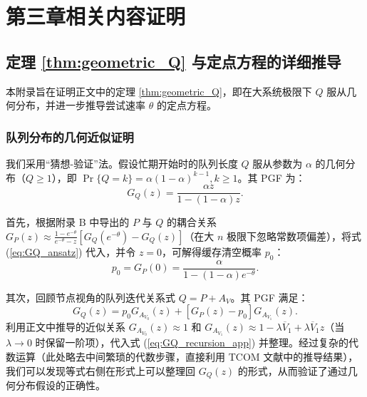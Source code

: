 \chapter{第三章相关内容证明}
\label{app:sast_appendix}





\section{定理 \ref{thm:geometric_Q} 与定点方程的详细推导}
\label{app:proof_theorem_fixed_point}


本附录旨在证明正文中的定理 \ref{thm:geometric_Q}，即在大系统极限下 $Q$ 服从几何分布，并进一步推导尝试速率 $\theta$ 的定点方程。

\subsection{队列分布的几何近似证明}

我们采用“猜想-验证”法。假设忙期开始时的队列长度 $Q$ 服从参数为 $\alpha$ 的几何分布（$Q \ge 1$），即 $\Pr\{Q=k\} = \alpha(1-\alpha)^{k-1}, k \ge 1$。其 PGF 为：
\begin{equation}
	\label{eq:GQ_ansatz}
	G_Q(z) = \frac{\alpha z}{1 - (1 - \alpha) z}.
\end{equation}

首先，根据附录 B 中导出的 $P$ 与 $Q$ 的耦合关系 $G_P(z) \approx \frac{1 - e^{-\theta}}{e^{-\theta} - z} [G_Q(e^{-\theta}) - G_Q(z)]$（在大 $n$ 极限下忽略常数项偏差），将式 (\ref{eq:GQ_ansatz}) 代入，并令 $z=0$，可解得缓存清空概率 $p_0$：
\begin{equation}
	\label{eq:p0_alpha}
	p_0 = G_P(0) = \frac{\alpha}{1 - (1 - \alpha) e^{-\theta}}.
\end{equation}

其次，回顾节点视角的队列迭代关系式 $Q = P + A_V$。其 PGF 满足：
\begin{equation}
	\label{eq:GQ_recursion_app}
	G_Q(z) = p_0 G_{A_{V_0}}(z) + [G_P(z) - p_0] G_{A_{V_1}}(z).
\end{equation}
利用正文中推导的近似关系 $G_{A_{V_0}}(z) \approx 1$ 和 $G_{A_{V_1}}(z) \approx 1 - \lambda \overline{V}_1 + \lambda \overline{V}_1 z$（当 $\lambda \to 0$ 时保留一阶项），代入式 (\ref{eq:GQ_recursion_app}) 并整理。经过复杂的代数运算（此处略去中间繁琐的代数步骤，直接利用 TCOM 文献中的推导结果），我们可以发现等式右侧在形式上可以整理回 $G_Q(z)$ 的形式，从而验证了通过几何分布假设的正确性。

